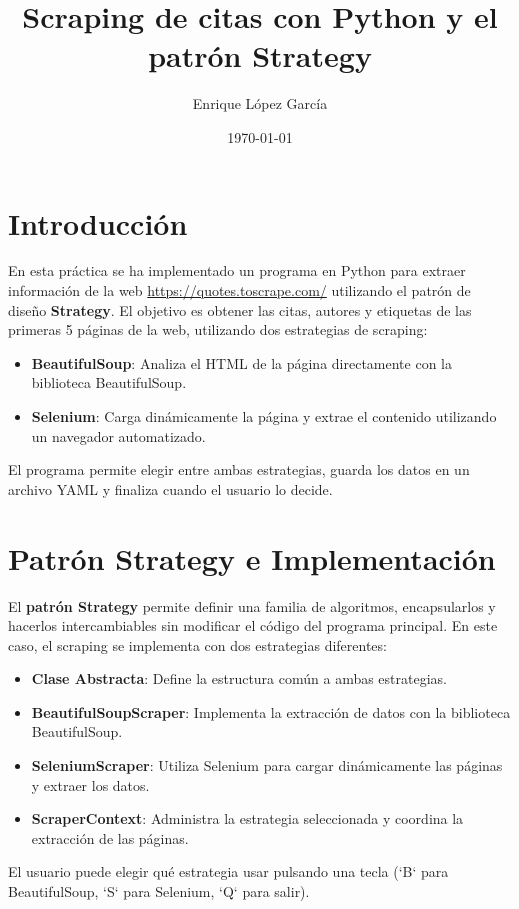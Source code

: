 \documentclass[a4paper,12pt]{article}
\title{Scraping de citas con Python y el patrón Strategy}
\author{Enrique López García}
\date{\today}
\begin{document}
\maketitle

\section{Introducción}
En esta práctica se ha implementado un programa en Python para extraer información de la web \url{https://quotes.toscrape.com/} utilizando el patrón de diseño \textbf{Strategy}. 
El objetivo es obtener las citas, autores y etiquetas de las primeras 5 páginas de la web, utilizando dos estrategias de scraping: 
\begin{itemize}
    \item \textbf{BeautifulSoup}: Analiza el HTML de la página directamente con la biblioteca BeautifulSoup.
    \item \textbf{Selenium}: Carga dinámicamente la página y extrae el contenido utilizando un navegador automatizado.
\end{itemize}

El programa permite elegir entre ambas estrategias, guarda los datos en un archivo YAML y finaliza cuando el usuario lo decide.

\section{Patrón Strategy e Implementación}
El \textbf{patrón Strategy} permite definir una familia de algoritmos, encapsularlos y hacerlos intercambiables sin modificar el código del programa principal. En este caso, el scraping se implementa con dos estrategias diferentes:

\begin{itemize}
    \item \textbf{Clase Abstracta}: Define la estructura común a ambas estrategias.
    \item \textbf{BeautifulSoupScraper}: Implementa la extracción de datos con la biblioteca BeautifulSoup.
    \item \textbf{SeleniumScraper}: Utiliza Selenium para cargar dinámicamente las páginas y extraer los datos.
    \item \textbf{ScraperContext}: Administra la estrategia seleccionada y coordina la extracción de las páginas.
\end{itemize}

El usuario puede elegir qué estrategia usar pulsando una tecla (`B` para BeautifulSoup, `S` para Selenium, `Q` para salir).
\end{document}
